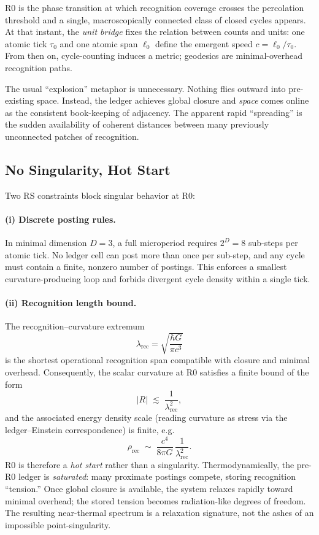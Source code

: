 \documentclass[11pt]{article}
\theoremstyle{definition}
\theoremstyle{remark}
\begin{document}
R0 is the phase transition at which recognition coverage crosses the percolation threshold and a single, macroscopically connected class of closed cycles appears. At that instant, the \emph{unit bridge} fixes the relation between counts and units: one atomic tick \(\tau_0\) and one atomic span \(\ell_0\) define the emergent speed \(c=\ell_0/\tau_0\). From then on, cycle-counting induces a metric; geodesics are minimal-overhead recognition paths.

The usual “explosion” metaphor is unnecessary. Nothing flies outward into pre-existing space. Instead, the ledger achieves global closure and \emph{space} comes online as the consistent book-keeping of adjacency. The apparent rapid “spreading” is the sudden availability of coherent distances between many previously unconnected patches of recognition.

\subsection{No Singularity, Hot Start}
Two RS constraints block singular behavior at R0:

\paragraph{(i) Discrete posting rules.} In minimal dimension \(D=3\), a full microperiod requires \(2^D=8\) sub-steps per atomic tick. No ledger cell can post more than once per sub-step, and any cycle must contain a finite, nonzero number of postings. This enforces a smallest curvature-producing loop and forbids divergent cycle density within a single tick.

\paragraph{(ii) Recognition length bound.} The recognition–curvature extremum
\[
\lambda_{\mathrm{rec}}=\sqrt{\frac{\hbar G}{\pi c^3}}
\]
is the shortest operational recognition span compatible with closure and minimal overhead. Consequently, the scalar curvature at R0 satisfies a finite bound of the form
\[
|R| \;\lesssim\; \frac{1}{\lambda_{\mathrm{rec}}^{2}},
\]
and the associated energy density scale (reading curvature as stress via the ledger–Einstein correspondence) is finite, e.g.
\[
\rho_{\mathrm{rec}}\;\sim\;\frac{c^4}{8\pi G}\,\frac{1}{\lambda_{\mathrm{rec}}^{2}}.
\]
R0 is therefore a \emph{hot start} rather than a singularity. Thermodynamically, the pre-R0 ledger is \emph{saturated}: many proximate postings compete, storing recognition “tension.” Once global closure is available, the system relaxes rapidly toward minimal overhead; the stored tension becomes radiation-like degrees of freedom. The resulting near-thermal spectrum is a relaxation signature, not the ashes of an impossible point-singularity.
\end{document}
